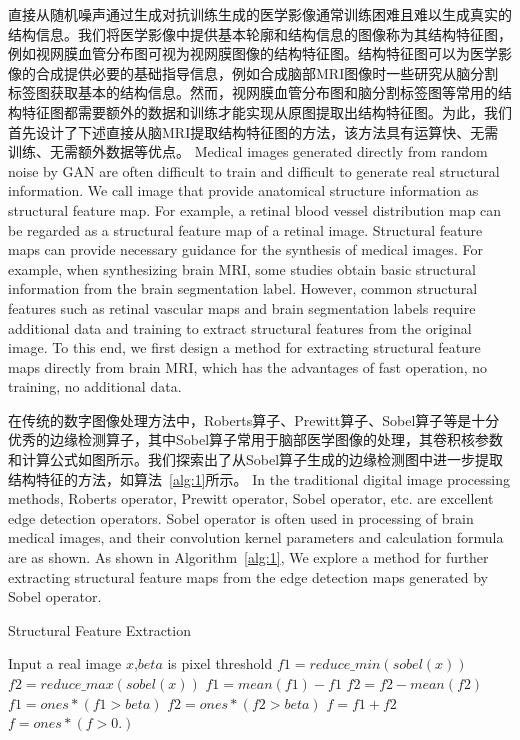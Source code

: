 \documentclass[letterpaper]{article} %
\begin{document}
直接从随机噪声通过生成对抗训练生成的医学影像通常训练困难且难以生成真实的结构信息。我们将医学影像中提供基本轮廓和结构信息的图像称为其结构特征图，例如视网膜血管分布图可视为视网膜图像的结构特征图\cite{41costa2017towards}。结构特征图可以为医学影像的合成提供必要的基础指导信息，例如合成脑部MRI图像时一些研究从脑分割标签图获取基本的结构信息\cite{4shin2018medical}。然而，视网膜血管分布图和脑分割标签图等常用的结构特征图都需要额外的数据和训练才能实现从原图提取出结构特征图。为此，我们首先设计了下述直接从脑MRI提取结构特征图的方法，该方法具有运算快、无需训练、无需额外数据等优点。
Medical images generated directly from random noise by GAN are often difficult to train and difficult to generate real structural information. We call image that provide anatomical structure information as structural feature map. For example, a retinal blood vessel distribution map can be regarded as a structural feature map of a retinal image\cite{41costa2017towards}. Structural feature maps can provide necessary guidance for the synthesis of medical images. For example, when synthesizing brain MRI, some studies obtain basic structural information from the brain segmentation label\cite{4shin2018medical}. However, common structural features such as retinal vascular maps and brain segmentation labels require additional data and training to extract structural features from the original image. To this end, we first design a method for extracting structural feature maps directly from brain MRI, which has the advantages of fast operation, no training, no additional data. 

在传统的数字图像处理方法中，Roberts算子\cite{87Roberts}、Prewitt算子\cite{88prewitt}、Sobel算子\cite{89Sobel}等是十分优秀的边缘检测算子，其中Sobel算子常用于脑部医学图像的处理，其卷积核参数和计算公式如图所示。我们探索出了从Sobel算子生成的边缘检测图中进一步提取结构特征的方法，如算法~\ref{alg:1}所示。
In the traditional digital image processing methods, Roberts operator, Prewitt operator, Sobel operator, etc. are excellent edge detection operators. Sobel operator is often used in processing of brain medical images, and their convolution kernel parameters and calculation formula are as shown. As shown in Algorithm~\ref{alg:1}, We explore a method for further extracting structural feature maps from the edge detection maps generated by Sobel operator.
\begin{algorithm}
	\caption{Structural Feature Extraction}
	\label{alg:1}
	\begin{algorithmic}[1]
		\State Input a real image $x$,$beta$ is pixel threshold
		\State $f1 = reduce\_min(sobel(x))$
		\State $f2 = reduce\_max(sobel(x))$
		\State $f1 = mean(f1) - f1$
		\State $f2 = f2 - mean(f2)$
		\State $f1 = ones * (f1 > beta)$
		\State $f2 = ones * (f2 > beta)$
		\State $f = f1 + f2$
		\State $f = ones * (f > 0.)$
	\end{algorithmic}  
\end{algorithm}
\end{document}
